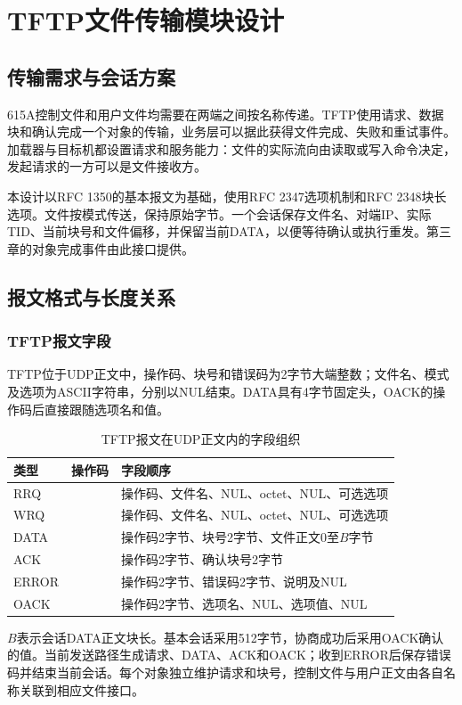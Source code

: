\chapter{TFTP文件传输模块设计}
\section{传输需求与会话方案}
615A控制文件和用户文件均需要在两端之间按名称传递。TFTP使用请求、数据块和确认完成一个对象的传输，业务层可以据此获得文件完成、失败和重试事件。加载器与目标机都设置请求和服务能力：文件的实际流向由读取或写入命令决定，发起请求的一方可以是文件接收方。

本设计以RFC 1350的基本报文为基础，使用RFC 2347选项机制和RFC 2348块长选项。文件按模式传送，保持原始字节。一个会话保存文件名、对端IP、实际TID、当前块号和文件偏移，并保留当前DATA，以便等待确认或执行重发。第三章的对象完成事件由此接口提供。

\section{报文格式与长度关系}
\subsection{TFTP报文字段}
TFTP位于UDP正文中，操作码、块号和错误码为2字节大端整数；文件名、模式及选项为ASCII字符串，分别以NUL结束。DATA具有4字节固定头，OACK的操作码后直接跟随选项名和值。

\begin{table}[htbp]\centering\small
\caption{TFTP报文在UDP正文内的字段组织}
\begin{tabularx}{\linewidth}{@{}l l Y@{}}\toprule 类型 & 操作码 & 字段顺序\\\midrule
RRQ &  & 操作码、文件名、NUL、octet、NUL、可选选项\\
WRQ &  & 操作码、文件名、NUL、octet、NUL、可选选项\\
DATA &  & 操作码2字节、块号2字节、文件正文0至$B$字节\\
ACK &  & 操作码2字节、确认块号2字节\\
ERROR &  & 操作码2字节、错误码2字节、说明及NUL\\
OACK &  & 操作码2字节、选项名、NUL、选项值、NUL\\\bottomrule
\end{tabularx}\end{table}

$B$表示会话DATA正文块长。基本会话采用512字节，协商成功后采用OACK确认的值。当前发送路径生成请求、DATA、ACK和OACK；收到ERROR后保存错误码并结束当前会话。每个对象独立维护请求和块号，控制文件与用户正文由各自名称关联到相应文件接口。

